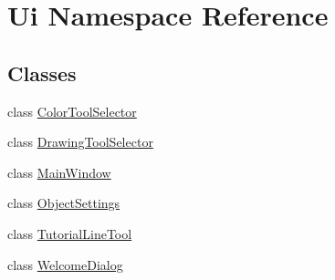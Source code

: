 \hypertarget{namespace_ui}{}\section{Ui Namespace Reference}
\label{namespace_ui}
\subsection*{Classes}
\begin{DoxyCompactItemize}
\item 
class \hyperlink{class_ui_1_1_color_tool_selector}{Color\+Tool\+Selector}
\item 
class \hyperlink{class_ui_1_1_drawing_tool_selector}{Drawing\+Tool\+Selector}
\item 
class \hyperlink{class_ui_1_1_main_window}{Main\+Window}
\item 
class \hyperlink{class_ui_1_1_object_settings}{Object\+Settings}
\item 
class \hyperlink{class_ui_1_1_tutorial_line_tool}{Tutorial\+Line\+Tool}
\item 
class \hyperlink{class_ui_1_1_welcome_dialog}{Welcome\+Dialog}
\end{DoxyCompactItemize}
